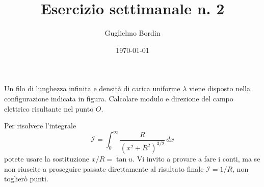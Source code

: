 \documentclass[10pt]{gulartcl}
\title{Esercizio settimanale n. 2}
\author{Guglielmo Bordin}
\date{\today}
\begin{document}
\maketitle

\noindent
Un filo di lunghezza infinita e densità di carica uniforme $\lambda$
viene disposto nella configurazione indicata in figura. Calcolare modulo e
direzione del campo elettrico risultante nel punto $O$.

\bigbreak
\begin{center}
\end{center}
\bigbreak

\begin{hint}
Per risolvere l’integrale
\[
    \mathcal{I} = \int_{0}^{\infty} \frac{R}{(x^2 + R^2)^{3/2}} \, dx
\]
potete usare la sostituzione $x / R = \tan u$. Vi invito a provare a fare i
conti, ma se non riuscite a proseguire passate direttamente al risultato
finale $\mathcal{I} = 1 / R$, non toglierò punti.
\end{hint}
\end{document}
